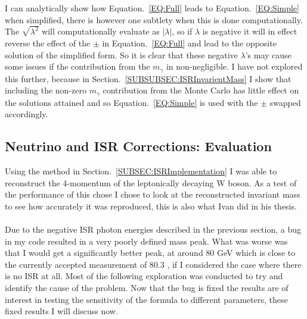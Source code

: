 I can analytically show how Equation.~\ref{EQ:Full} leads to Equation.~\ref{EQ:Simple} when simplified, there is however one subtlety when this is done computationally. The $\sqrt{ {\lambda}^{2}}$ will computationally evaluate as $|{\lambda}|$, so if $\lambda$ is negative it will in effect reverse the effect of the $\pm$ in Equation.~\ref{EQ:Full} and lead to the opposite solution of the simplified form. So it is clear that these negative $\lambda$'s may cause some issues if the contribution from the ${m}_{\gamma}$ in non-negligible. I have not explored this further, because in Section.~\ref{SUBSUBSEC:ISRInvarientMass} I show that including the non-zero ${m}_{\gamma}$ contribution from the Monte Carlo has little effect on the solutions attained and so Equation.~\ref{EQ:Simple} is used with the $\pm$ swapped accordingly.

\subsection{Neutrino and ISR Corrections: Evaluation}
\label{SUBSEC:ISREvaluation}
Using the method in Section.~\ref{SUBSEC:ISRImplementation} I was able to reconstruct the 4-momentum of the leptonically decaying W boson. As a test of the performance of this chose I chose to look at the reconstructed invariant mass to see how accurately it was reproduced, this is also what Ivan did in his thesis.
\\\\
Due to the negative ISR photon energies described in the previous section, a bug in my code resulted in a very poorly defined mass peak. What was worse was that I would get a significantly better peak, at around 80 GeV which is close to the currently accepted measurement of 80.3 \cite{pdgLive}, if I considered the case where there is no ISR at all. Most of the following exploration was conducted to try and identify the cause of the problem. Now that the bug is fixed the results are of interest in testing the sensitivity of the formula to different parameters, these fixed results I will discuss now.

